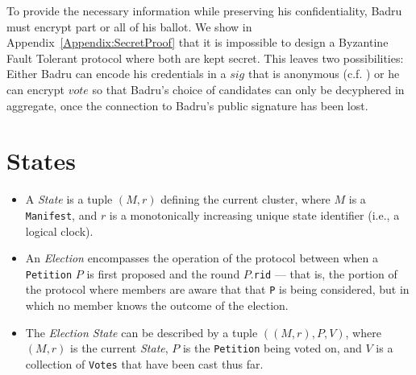 \begin{itemize}
    To provide the necessary information while preserving his
    confidentiality, Badru must encrypt part or all of his ballot.
    We show
    in Appendix~\ref{Appendix:SecretProof} that it is impossible to design
    a Byzantine Fault Tolerant protocol where both are kept secret. This leaves
    two possibilities:
    Either Badru can encode his credentials in a $sig$ that is anonymous
    (c.f. \cite{lrs})
    or he can encrypt $vote$ so that Badru's choice of candidates can only be
    decyphered in aggregate, once the connection to Badru's public signature has
    been lost.

\end{itemize}

\section{States}
\begin{itemize}
  \item A \emph{State} is a tuple $(M, r)$ defining the current cluster, where
    $M$ is a \texttt{Manifest}, and $r$ is a monotonically increasing unique
    state identifier (i.e., a logical clock)\tocite.

  \item An \emph{Election} encompasses the operation of the protocol between
    when a \texttt{Petition} $P$ is first proposed and the round
    $P$.\texttt{rid} --- that is, the portion of the protocol where members are
    aware that that \texttt{P} is being considered, but in which no member knows
    the outcome of the election.

  \item The \emph{Election State} can be described by a tuple
    $((M, r), P, V)$, where $(M, r)$ is the current \emph{State}, $P$ is the
    \texttt{Petition} being voted on, and $V$ is a collection of \texttt{Votes}
    that have been cast thus far.

\end{itemize}

